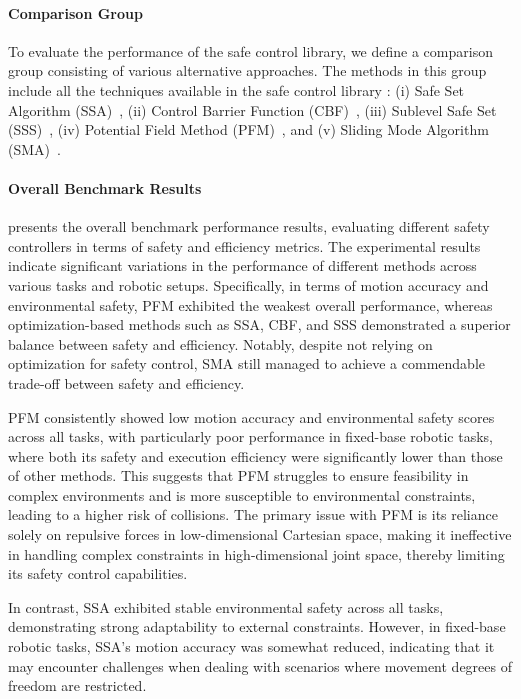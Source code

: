 \paragraph{Comparison Group}  
To evaluate the performance of the \spark safe control library, we define a comparison group consisting of various alternative approaches. The methods in this group include all the techniques available in the safe control library \spark:
(i) Safe Set Algorithm (SSA)~\citep{liu2014control},  
(ii) Control Barrier Function (CBF)~\citep{ames2019control},  
(iii) Sublevel Safe Set (SSS)~\citep{wei2019safe},  
(iv) Potential Field Method (PFM)~\citep{khatib1986real}, and
(v) Sliding Mode Algorithm (SMA)~\citep{gracia2013reactive}.  



\paragraph{Overall Benchmark Results}
 presents the overall benchmark performance results, evaluating different safety controllers in terms of safety and efficiency metrics. The experimental results indicate significant variations in the performance of different methods across various tasks and robotic setups. Specifically, in terms of motion accuracy and environmental safety, PFM exhibited the weakest overall performance, whereas optimization-based methods such as SSA, CBF, and SSS demonstrated a superior balance between safety and efficiency. Notably, despite not relying on optimization for safety control, SMA still managed to achieve a commendable trade-off between safety and efficiency.

PFM consistently showed low motion accuracy and environmental safety scores across all tasks, with particularly poor performance in fixed-base robotic tasks, where both its safety and execution efficiency were significantly lower than those of other methods. This suggests that PFM struggles to ensure feasibility in complex environments and is more susceptible to environmental constraints, leading to a higher risk of collisions. The primary issue with PFM is its reliance solely on repulsive forces in low-dimensional Cartesian space, making it ineffective in handling complex constraints in high-dimensional joint space, thereby limiting its safety control capabilities.

In contrast, SSA exhibited stable environmental safety across all tasks, demonstrating strong adaptability to external constraints. However, in fixed-base robotic tasks, SSA's motion accuracy was somewhat reduced, indicating that it may encounter challenges when dealing with scenarios where movement degrees of freedom are restricted.


